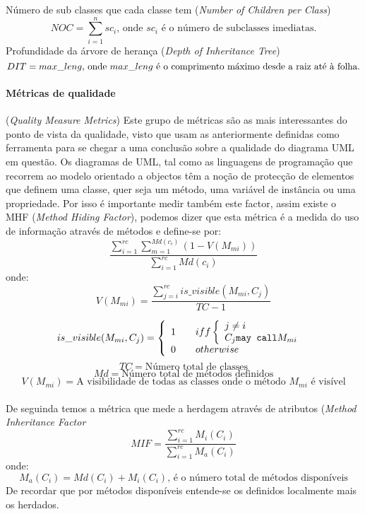 Número de sub classes que cada classe tem (\textit{Number of Children per Class})
\begin{displaymath}
NOC = \sum_{i=1}^{n} sc_i  \textrm{, onde $sc_i$ é o número de subclasses imediatas.}
\end{displaymath}
Profundidade da árvore de herança (\textit{Depth of Inheritance Tree})
\begin{displaymath}
DIT = max\_leng  \textrm{, onde $ max\_leng $ é o comprimento máximo desde a raiz até à folha.}
\end{displaymath}

\paragraph{Métricas de qualidade} (\textit{Quality Measure Metrics}) Este grupo de métricas são as mais interessantes do ponto de vista da qualidade, visto que
usam as anteriormente definidas como ferramenta para se chegar a uma conclusão sobre a qualidade do diagrama UML em questão.
Os diagramas de UML, tal como as linguagens de programação que recorrem ao modelo orientado a objectos têm a noção de protecção de elementos que definem uma classe,
quer seja um método, uma variável de instância ou uma propriedade. Por isso é importante medir também este factor, assim existe o MHF (\textit{Method Hiding Factor}),
podemos dizer que esta métrica é a medida do uso de informação através de métodos e define-se por:
\begin{displaymath}
\frac{\sum_{i=1}^{rc} \sum_{m=1}^{Md(c_i)} (1-V(M_{mi}))} {\sum_{i=1}^{rc} Md(c_i)}
\end{displaymath}
onde:
$$V(M_{mi}) = \frac{\sum_{j=i}^{rc} is\_visible(M_{mi},C_j)}{TC-1} $$

\[ is\_visible(M_{mi},C_j) = \left\{ \begin{array}{l l}
	1 & \quad iff \left \{
		\begin{array}{l l}
			j \neq i \\
			C_j \texttt{may call} M_{mi}\\
		\end{array}
	\right.\\
0 & \quad otherwise\\
\end{array} \right. \]
$$TC = \textrm{Número total de classes}$$
$$Md = \textrm{Número total de métodos definidos}$$
$$V(M_{mi}) = \textrm{A visibilidade de todas as classes onde o método $M_{mi}$ é visível}$$
\\
De seguinda temos a métrica que mede a herdagem através de atributos (\textit{Method Inheritance Factor} $$MIF = \frac{\sum_{i=1}^{rc} M_i(C_i)}{\sum_{i=1}^{rc} M_a(C_i)} $$
onde:
$$ M_a(C_i) = Md(C_i) + M_i(C_i)\textrm{, é o número total de métodos disponíveis}$$
De recordar que por métodos disponíveis entende-se os definidos localmente mais os herdados.

